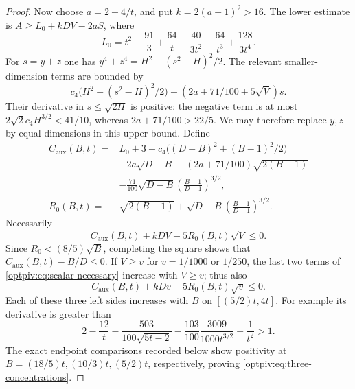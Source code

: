 \begin{proof}
Now choose $a=2-4/t$, and put $k=2(a+1)^2>16$. The lower estimate is
$A\ge L_0+kDV-2aS$, where
\[
 L_0=t^2-\frac{91}{3}+\frac{64}{t}-\frac{40}{3t^2}
                         -\frac{64}{t^3}+\frac{128}{3t^4}.
\]
For $s=y+z$ one has
$y^4+z^4=H^2-(s^2-H)^2/2$. The relevant smaller-dimension terms are
bounded by
\[
 c_4\bigl(H^2-(s^2-H)^2/2\bigr)
       +(2a+71/100+5\sqrt V)s.
\]
Their derivative in $s\le\sqrt{2H}$ is positive: the negative term is
at most $2\sqrt2c_4H^{3/2}<41/10$, whereas $2a+71/100>22/5$.
We may therefore replace $y,z$ by equal dimensions in this upper bound.
Define
\begin{align*}
 C_{\mathrm{aux}}(B,t)={}&L_0+3-c_4\bigl((D-B)^2+(B-1)^2/2\bigr)\\
 &-2a\sqrt{D-B}-(2a+71/100)\sqrt{2(B-1)}\\
 &-\frac{71}{100}\sqrt{D-B}
                         \left(\frac{B-1}{D-1}\right)^{3/2},\\
 R_0(B,t)={}&\sqrt{2(B-1)}+
 \sqrt{D-B}\left(\frac{B-1}{D-1}\right)^{3/2}.
\end{align*}
Necessarily
\begin{equation}\label{optpiv:eq:scalar-necessary}
 C_{\mathrm{aux}}(B,t)+kDV-5R_0(B,t)\sqrt V\le0.
\end{equation}
Since $R_0<(8/5)\sqrt B$, completing the square shows that
$C_{\mathrm{aux}}(B,t)-B/D\le0$. If $V\ge v$ for $v=1/1000$ or $1/250$, the last two
terms of \eqref{optpiv:eq:scalar-necessary} increase with $V\ge v$;
thus also
\[
 C_{\mathrm{aux}}(B,t)+kDv-5R_0(B,t)\sqrt v\le0.
\]
Each of these three left sides increases with $B$ on $[(5/2)t,4t]$.
For example its derivative is greater than
\[
 2-\frac{12}{t}-\frac{503}{100\sqrt{5t-2}}
 -\frac{103}{100}\frac{3009}{1000t^{3/2}}-\frac1{t^2}>1.
\]
The exact endpoint comparisons recorded below show positivity at
$B=(18/5)t,(10/3)t,(5/2)t$, respectively, proving
\eqref{optpiv:eq:three-concentrations}.
\end{proof}

